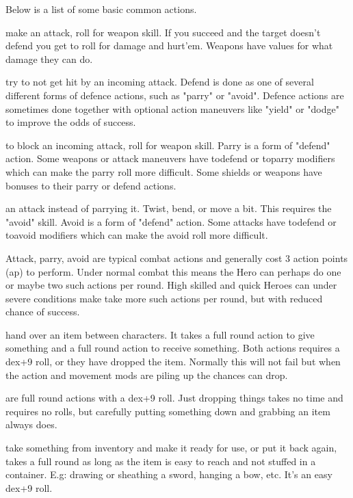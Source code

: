 Below is a list of some basic common actions.


\openactionslist


 make an attack, roll for weapon skill. If you succeed and the target doesn't defend you get to roll for damage and hurt'em. Weapons have values for what damage they can do.


 try to not get hit by an incoming attack. Defend is done as one of several different forms of defence actions, such as "parry" or "avoid". Defence actions are sometimes done together with optional action maneuvers like "yield" or "dodge" to improve the odds of success.


 to block an incoming attack, roll for weapon skill.
Parry is a form of "defend" action. Some weapons or attack maneuvers have todefend or toparry modifiers which can make the parry roll more difficult. Some shields or weapons have bonuses to their parry or defend actions.


 an attack instead of parrying it. Twist, bend, or move a bit. This requires the "avoid" skill. Avoid is a form of "defend" action. Some attacks have todefend or toavoid modifiers which can make the avoid roll more difficult.


\closeactionslist


\noindent
Attack, parry, avoid are typical combat actions and generally cost 3 action points (ap) to perform. Under normal combat this means the Hero can perhaps do one or maybe two such actions per round. High skilled and quick Heroes can under severe conditions make take more such actions per round, but with reduced chance of success.


\openactionslist


 hand over an item between characters. It takes a full round action to give something and a full round action to receive something. Both actions requires a dex+9 roll, or they have dropped the item. Normally this will not fail but when the action and movement mods are piling up the chances can drop.


 are full round actions with a dex+9 roll. Just dropping things takes no time and requires no rolls, but carefully putting something down and grabbing an item always does.


 take something from inventory and make it ready for use, or put it back again, takes a full round as long as the item is easy to reach and not stuffed in a container. E.g: drawing or sheathing a sword, hanging a bow, etc. It's an easy dex+9 roll.


